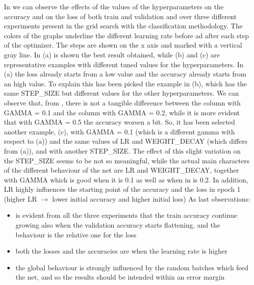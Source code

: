 \documentclass[10pt,twocolumn,hidelinks,letterpaper]{article}
\begin{document}
In  we can observe the effects of the values of the hyperparameters on the accuracy and on the loss of both train and validation and over three different experiments present in the grid search with the classification methodology. The colors of the graphs underline the different learning rate before ad after each step of the optimizer. The steps are shown on the x axis and marked with a vertical gray line. In (a) is shown the best result obtained, while (b) and (c) are representative examples with different tuned values for the hyperparameters. In (a) the loss already starts from a low value and the accuracy already starts from an high value. To explain this has been picked the example in (b), which has the same STEP\_SIZE but different values for the other hyperparameters. We can observe that, from , there is not a tangible difference between the column with GAMMA = 0.1 and the column with GAMMA = 0.2, while it is more evident that with GAMMA = 0.5 the accuracy worsen a bit. So, it has been selected another example, (c),  with GAMMA = 0.1 (which is a different gamma with respect to (a)) and the same values of LR and WEIGHT\_DECAY (which differs from (a)), and with another STEP\_SIZE. The effect of this slight variation on the STEP\_SIZE seems to be not so meaningful, while the actual main characters of the different behaviour of the net are LR and WEIGHT\_DECAY, together with GAMMA which is good when it is 0.1 as well as when in is 0.2. In addition, LR highly influences the starting point of the accuracy and the loss in epoch 1 (higher LR $\rightarrow$ lower initial accuracy and higher initial loss) As last observations:
\begin{itemize}
  \item is evident from all the three experiments that the train accuracy continue growing also when the validation accuracy starts flattening, and the behaviour is the relative one for the loss
  \item both the losses and the accuracies are  when the learning rate is higher
  \item the global behaviour is strongly influenced by the random batches which feed the net, and so the results should be intended within an error margin
\end{itemize}
\end{document}
